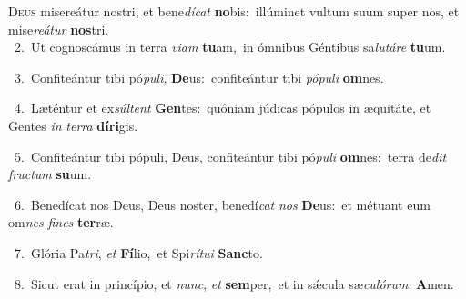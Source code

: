 \lettrine{\initial\textcolor{\initialcolor}{D}}{eus} misereátur nostri, et bene\-\textit{dí}\-\textit{cat} \textbf{no}\-bis:~\star illúminet vultum suum super nos, et mise\-\textit{re}\-\textit{á}\textit{tur} \textbf{nos}\-tri.\\
{\numbfont\textcolor{\numbcolor}{~2.}}~Ut cognoscámus in terra \textit{vi}\-\textit{am} \textbf{tu}\-am,~\star in ómnibus Géntibus sa\-\textit{lu}\-\textit{tá}\textit{re} \textbf{tu}\-um.\par
{\numbfont\textcolor{\numbcolor}{~3.}}~Confiteántur tibi pó\-\textit{pu}\-\textit{li}, \textbf{De}\-us:~\star confiteántur tibi \textit{pó}\-\textit{pu}\textit{li} \textbf{om}\-nes.\par
{\numbfont\textcolor{\numbcolor}{~4.}}~Læténtur et ex\-\textit{súl}\-\textit{tent} \textbf{Gen}\-tes:~\star quóniam júdicas pópulos in æquitáte, et Gentes \textit{in} \textit{ter}\-\textit{ra} \textbf{dí}\-\textbf{ri}gis.\par
{\numbfont\textcolor{\numbcolor}{~5.}}~Confiteántur tibi pópuli, Deus, confiteántur tibi pó\-\textit{pu}\-\textit{li} \textbf{om}\-nes:~\star terra de\textit{dit} \textit{fruc}\-\textit{tum} \textbf{su}\-um.\par
{\numbfont\textcolor{\numbcolor}{~6.}}~Benedícat nos Deus, Deus noster, benedí\textit{cat} \textit{nos} \textbf{De}\-us:~\star et métuant eum om\textit{nes} \textit{fi}\-\textit{nes} \textbf{ter}\-ræ.\par
{\numbfont\textcolor{\numbcolor}{~7.}}~Glória Pa\-\textit{tri}\-, \textit{et} \textbf{Fí}\-lio,~\star et Spi\-\textit{rí}\-\textit{tu}\textit{i} \textbf{Sanc}\-to.\par
{\numbfont\textcolor{\numbcolor}{~8.}}~Sicut erat in princípio, et \textit{nunc}\-, \textit{et} \textbf{sem}\-per,~\star et in sǽcula sæ\-\textit{cu}\-\textit{ló}\textit{rum}. \textbf{A}\-men.\par
